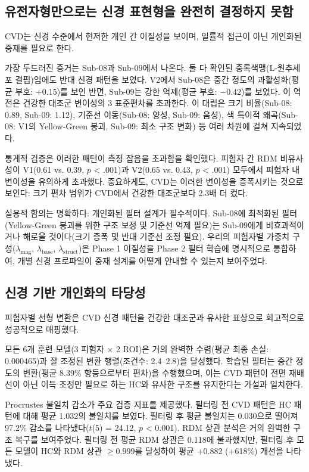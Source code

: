 \documentclass[12pt,a4paper]{article}
\begin{document}
\subsection{유전자형만으로는 신경 표현형을 완전히 결정하지 못함}

CVD는 신경 수준에서 현저한 개인 간 이질성을 보이며, 일률적 접근이 아닌 개인화된 중재를 필요로 한다.

가장 두드러진 증거는 Sub-08과 Sub-09에서 나온다. 둘 다 확인된 중록색맹(L-원추세포 결핍)임에도 반대 신경 패턴을 보였다. V2에서 Sub-08은 중간 정도의 과활성화(평균 부호: +0.15)를 보인 반면, Sub-09는 강한 억제(평균 부호: $-0.42$)를 보였다. 이 역전은 건강한 대조군 변이성의 3 표준편차를 초과한다. 이 대립은 크기 비율(Sub-08: 0.89, Sub-09: 1.12), 기준선 이동(Sub-08: 양성, Sub-09: 음성), 색 특이적 왜곡(Sub-08: V1의 Yellow-Green 붕괴, Sub-09: 최소 구조 변화) 등 여러 차원에 걸쳐 지속되었다.

통계적 검증은 이러한 패턴이 측정 잡음을 초과함을 확인했다. 피험자 간 RDM 비유사성이 V1(0.61 vs. 0.39, $p$ < .001)과 V2(0.65 vs. 0.43, $p$ < .001) 모두에서 피험자 내 변이성을 유의하게 초과했다. 중요하게도, CVD는 이러한 변이성을 증폭시키는 것으로 보인다: 크기 편차 범위가 CVD에서 건강한 대조군보다 2.3배 더 컸다.

실용적 함의는 명확하다: 개인화된 필터 설계가 필수적이다. Sub-08에 최적화된 필터(Yellow-Green 붕괴를 위한 구조 보정 및 기준선 억제 필요)는 Sub-09에게 비효과적이거나 해로울 것이다(크기 증폭 및 반대 기준선 조정 필요). 우리의 피험자별 가중치 구성($\lambda_{\text{mag}}$, $\lambda_{\text{base}}$, $\lambda_{\text{struct}}$)은 Phase 1 이질성을 Phase 2 필터 학습에 명시적으로 통합하여, 개별 신경 프로파일이 중재 설계를 어떻게 안내할 수 있는지 보여주었다.

\subsection{신경 기반 개인화의 타당성}

피험자별 선형 변환은 CVD 신경 패턴을 건강한 대조군과 유사한 표상으로 회고적으로 성공적으로 매핑했다.

모든 6개 훈련 모델(3 피험자 × 2 ROI)은 거의 완벽한 수렴(평균 최종 손실: 0.000465)과 잘 조정된 변환 행렬(조건수: 2.4--2.8)을 달성했다. 학습된 필터는 중간 정도의 변환(평균 8.39\% 항등으로부터 편차)을 수행했으며, 이는 CVD 패턴이 전면 재배선이 아닌 이득 조정만 필요로 하는 HC와 유사한 구조를 유지한다는 가설과 일치한다.

Procrustes 불일치 감소가 주요 검증 지표를 제공했다. 필터링 전 CVD 패턴은 HC 패턴에 대해 평균 1.032의 불일치를 보였다. 필터링 후 평균 불일치는 0.030으로 떨어져 97.2\% 감소를 나타냈다($t$(5) = 24.12, $p$ < 0.001). RDM 상관 분석은 거의 완벽한 구조 복구를 보여주었다. 필터링 전 평균 RDM 상관은 0.118에 불과했지만, 필터링 후 모든 모델이 HC와 RDM 상관 $\geq 0.999$를 달성하여 평균 +0.882 (+618\%) 개선을 나타냈다.
\end{document}
